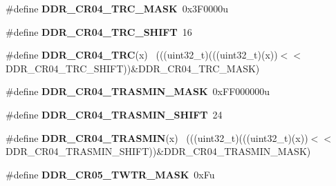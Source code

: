 \begin{DoxyCompactItemize}
\item 
\hypertarget{group___d_d_r___register___masks_ga2963c6b828fd21a34a8efabaf41dee64}{}\#define {\bfseries D\+D\+R\+\_\+\+C\+R04\+\_\+\+T\+R\+C\+\_\+\+M\+A\+S\+K}~0x3\+F0000u\label{group___d_d_r___register___masks_ga2963c6b828fd21a34a8efabaf41dee64}

\item 
\hypertarget{group___d_d_r___register___masks_ga0f5e9700aa510317d0de141f7279f9ac}{}\#define {\bfseries D\+D\+R\+\_\+\+C\+R04\+\_\+\+T\+R\+C\+\_\+\+S\+H\+I\+F\+T}~16\label{group___d_d_r___register___masks_ga0f5e9700aa510317d0de141f7279f9ac}

\item 
\hypertarget{group___d_d_r___register___masks_ga82fa0166b297d3596ff1525567bb7173}{}\#define {\bfseries D\+D\+R\+\_\+\+C\+R04\+\_\+\+T\+R\+C}(x)                                                ~(((uint32\+\_\+t)(((uint32\+\_\+t)(x))$<$$<$D\+D\+R\+\_\+\+C\+R04\+\_\+\+T\+R\+C\+\_\+\+S\+H\+I\+F\+T))\&D\+D\+R\+\_\+\+C\+R04\+\_\+\+T\+R\+C\+\_\+\+M\+A\+S\+K)\label{group___d_d_r___register___masks_ga82fa0166b297d3596ff1525567bb7173}

\item 
\hypertarget{group___d_d_r___register___masks_ga30a600af23cfd356053e29d0969a30ae}{}\#define {\bfseries D\+D\+R\+\_\+\+C\+R04\+\_\+\+T\+R\+A\+S\+M\+I\+N\+\_\+\+M\+A\+S\+K}~0x\+F\+F000000u\label{group___d_d_r___register___masks_ga30a600af23cfd356053e29d0969a30ae}

\item 
\hypertarget{group___d_d_r___register___masks_gaef279d22664292e4ea833b5bb602a0e8}{}\#define {\bfseries D\+D\+R\+\_\+\+C\+R04\+\_\+\+T\+R\+A\+S\+M\+I\+N\+\_\+\+S\+H\+I\+F\+T}~24\label{group___d_d_r___register___masks_gaef279d22664292e4ea833b5bb602a0e8}

\item 
\hypertarget{group___d_d_r___register___masks_ga5df31734452d2c6157f80711606f22ee}{}\#define {\bfseries D\+D\+R\+\_\+\+C\+R04\+\_\+\+T\+R\+A\+S\+M\+I\+N}(x)                                        ~(((uint32\+\_\+t)(((uint32\+\_\+t)(x))$<$$<$D\+D\+R\+\_\+\+C\+R04\+\_\+\+T\+R\+A\+S\+M\+I\+N\+\_\+\+S\+H\+I\+F\+T))\&D\+D\+R\+\_\+\+C\+R04\+\_\+\+T\+R\+A\+S\+M\+I\+N\+\_\+\+M\+A\+S\+K)\label{group___d_d_r___register___masks_ga5df31734452d2c6157f80711606f22ee}

\item 
\hypertarget{group___d_d_r___register___masks_gadb052ffd7dc89583236d5c16fbb5d046}{}\#define {\bfseries D\+D\+R\+\_\+\+C\+R05\+\_\+\+T\+W\+T\+R\+\_\+\+M\+A\+S\+K}~0x\+Fu\label{group___d_d_r___register___masks_gadb052ffd7dc89583236d5c16fbb5d046}


\end{DoxyCompactItemize}
